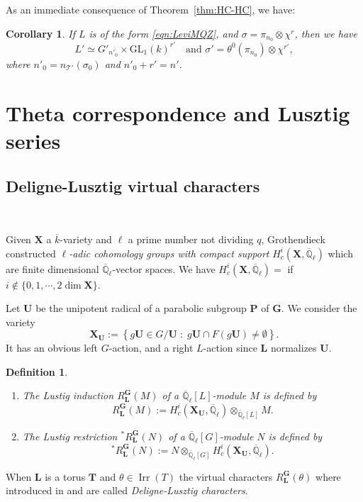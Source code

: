 \documentclass[12pt]{amsart}
\numberwithin{equation}{subsection}
\newtheorem{cor}[equation]{Corollary}
\newtheorem{defn}[equation]{Definition}
\newcommand{\Qlbar}{\overline{\mathbb{Q}}_\ell}
\newcommand{\cT}{\mathcal{T}}
\newcommand{\bG}{\mathbf{G}}
\newcommand{\bL}{\mathbf{L}}
\newcommand{\bP}{\mathbf{P}}
\newcommand{\bT}{\mathbf{T}}
\newcommand{\bU}{\mathbf{U}}
\newcommand{\Irr}{\operatorname{Irr}}
\newcommand{\GL}{\mathrm{GL}}
\def\bX{{\mathbf{X}}}
\def\cT{{\mathcal{T}}}
\begin{document}
As an immediate consequence of Theorem~\ref{thm:HC-HC}, we have:
\begin{cor} \label{cor:HC}
If $L$ is of the form \eqref{eqn:LeviMQZ}, and $\sigma=\pi_{n_0}\otimes \chi^r$, then we have
\[L'\simeq G'_{n'_0}\times \GL_{1}(k)^{r'}\quad\text{and $\sigma'=\theta^0(\pi_{n_0})\otimes\chi^{r'}$},\]
where $n'_0=n_{\cT'}(\sigma_0)$ and $n'_0+r'=n'$.
\end{cor}

\section{Theta correspondence and Lusztig series} \label{sec:Lusztig}
\subsection{Deligne-Lusztig virtual characters}\

Given $\bX$ a $\overline k$-variety and $\ell$ a prime number not dividing $q$, Grothendieck constructed \textit{$\ell$-adic cohomology groups with compact support} $H_c^i(\bX,\Qlbar)$ which are finite dimensional $\Qlbar$-vector spaces.
We have $H_c^i(\bX,\Qlbar)=$ if $i\notin\{0,1,\cdots,2\dim\bX\}$.

Let $\bU$ be the unipotent radical of a parabolic subgroup $\bP$ of $\bG$. We consider the variety 
\begin{equation}
\bX_\bU:=\left\{g\bU \in G/\bU \;:\;g\bU \cap F (g\bU)\ne\emptyset\right\}.
\end{equation} 
It has an obvious left $G$-action, and a right $L$-action since $\bL$ normalizes $\bU$.

\begin{defn}\
 {\rm 
\begin{enumerate}
\item The \textit{Lustig induction} $R_\bL^\bG(M)$ of a $\Qlbar[L]$-module $M$ is defined by
\[R_\bL^\bG(M):=H_c^i(\bX_\bU,\Qlbar)\otimes_{\Qlbar[L]} M.\]
\item The \textit{Lustig restriction} ${}^\ast R_\bL^\bG(N)$ of a $\Qlbar[G]$-module $N$ is defined by
\[{}^\ast R_\bL^\bG(N):=N \otimes_{\Qlbar[G]} H_c^i(\bX_\bU,\Qlbar).\]
\end{enumerate}}
\end{defn}

When $\bL$ is a torus $\bT$ and $\theta\in\Irr(T)$ the virtual characters $R_\bL^\bG(\theta)$  where introduced in \cite{DL} and are called \textit{Deligne-Lusztig characters}. 
\end{document}
